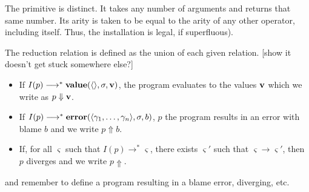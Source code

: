 The  primitive is distinct.
It takes any number of arguments and returns that same number.
Its arity is taken to be equal to the arity of any other operator, including itself.
Thus, the installation  is legal, if superfluous).



The reduction relation is defined as the union of each given relation.
[show it doesn't get stuck somewhere else?]
\begin{itemize}
\item If $I(p)\longrightarrow^{*}\mathbf{value}(\langle\rangle,\sigma,\mathbf{v})$, the program evaluates to the values $\mathbf{v}$ which we write as $p\Downarrow\mathbf{v}$.
\item If $I(p)\longrightarrow^{*}\mathbf{error}(\langle\gamma_1,\dots,\gamma_n\rangle,\sigma,b)$, $p$ the program results in an error with blame $b$ and we write $p\Uparrow b$.
\item If, for all $\varsigma$ such that $I(p)\longrightarrow^{*}\varsigma$, there exists $\varsigma'$ such that $\varsigma\longrightarrow\varsigma'$, then $p$ diverges and we write $p\Uparrow$.
\end{itemize}


and remember to define a program resulting in a blame error, diverging, etc.